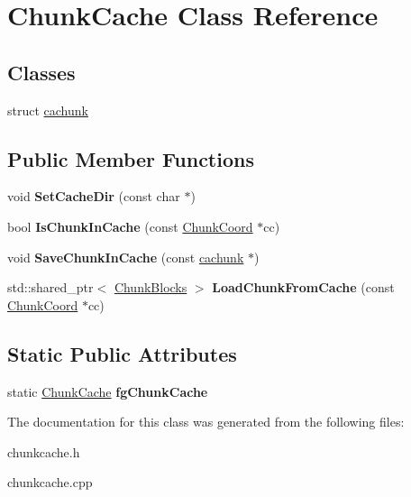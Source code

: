\hypertarget{classChunkCache}{\section{\-Chunk\-Cache \-Class \-Reference}
\label{classChunkCache}
}
\subsection*{\-Classes}
\begin{DoxyCompactItemize}
\item 
struct \hyperlink{structChunkCache_1_1cachunk}{cachunk}
\end{DoxyCompactItemize}
\subsection*{\-Public \-Member \-Functions}
\begin{DoxyCompactItemize}
\item 
\hypertarget{classChunkCache_a55102f0f514b09b47dae4183157595b1}{void {\bfseries \-Set\-Cache\-Dir} (const char $\ast$)}\label{classChunkCache_a55102f0f514b09b47dae4183157595b1}

\item 
\hypertarget{classChunkCache_a461d4ef9f261f0e6e126d9148bcac50e}{bool {\bfseries \-Is\-Chunk\-In\-Cache} (const \hyperlink{structChunkCoord}{\-Chunk\-Coord} $\ast$cc)}\label{classChunkCache_a461d4ef9f261f0e6e126d9148bcac50e}

\item 
\hypertarget{classChunkCache_ab142e310653e49dfd4b6eec5097d3ced}{void {\bfseries \-Save\-Chunk\-In\-Cache} (const \hyperlink{structChunkCache_1_1cachunk}{cachunk} $\ast$)}\label{classChunkCache_ab142e310653e49dfd4b6eec5097d3ced}

\item 
\hypertarget{classChunkCache_a6f94c1bcea2290cd0f54d4dd5d58d99a}{std\-::shared\-\_\-ptr$<$ \hyperlink{structChunkBlocks}{\-Chunk\-Blocks} $>$ {\bfseries \-Load\-Chunk\-From\-Cache} (const \hyperlink{structChunkCoord}{\-Chunk\-Coord} $\ast$cc)}\label{classChunkCache_a6f94c1bcea2290cd0f54d4dd5d58d99a}

\end{DoxyCompactItemize}
\subsection*{\-Static \-Public \-Attributes}
\begin{DoxyCompactItemize}
\item 
\hypertarget{classChunkCache_a1140dc6c19fab12ef83a7fd2267281f3}{static \hyperlink{classChunkCache}{\-Chunk\-Cache} {\bfseries fg\-Chunk\-Cache}}\label{classChunkCache_a1140dc6c19fab12ef83a7fd2267281f3}

\end{DoxyCompactItemize}


\-The documentation for this class was generated from the following files\-:\begin{DoxyCompactItemize}
\item 
chunkcache.\-h\item 
chunkcache.\-cpp\end{DoxyCompactItemize}

